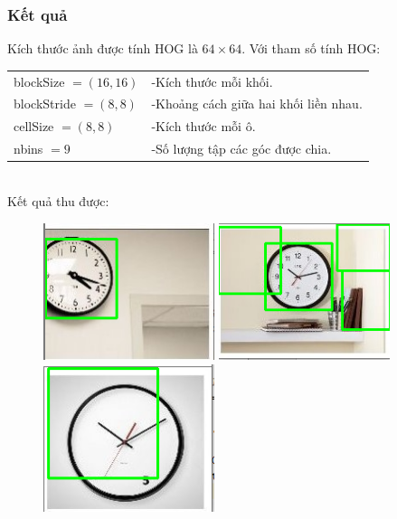 \documentclass[../report.tex]{subfiles}
\begin{document}
\subsubsection{Kết quả}
Kích thước ảnh được tính HOG là $64 \times 64$. 
Với tham số tính HOG: \\[3mm]
\begin{tabular}{|l l|}
\hline
blockSize $= (16, 16)$  &-Kích thước mỗi khối. \\
blockStride $= (8, 8)$  &-Khoảng cách giữa hai khối liền nhau.  \\
cellSize $= (8, 8)$     &-Kích thước mỗi ô. \\
nbins $= 9$             &-Số lượng tập các góc được chia. \\
\hline
\end{tabular} \\[3mm]
Kết quả thu được:
\begin{figure}[H]
\centering
\includegraphics[width=5cm]{figures/test-3-1.png}
\includegraphics[width=5cm]{figures/test-3-2.png}
\includegraphics[width=5cm]{figures/test-3-3.png}
\end{figure}
\end{document}
